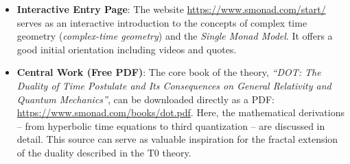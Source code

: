	\begin{itemize}
		\item \textbf{Interactive Entry Page}: The website \href{https://www.smonad.com/start/}{https://www.smonad.com/start/} serves as an interactive introduction to the concepts of complex time geometry (\emph{complex-time geometry}) and the \emph{Single Monad Model}. It offers a good initial orientation including videos and quotes.
		\item \textbf{Central Work (Free PDF)}: The core book of the theory, \emph{``DOT: The Duality of Time Postulate and Its Consequences on General Relativity and Quantum Mechanics''}, can be downloaded directly as a PDF: \href{https://www.smonad.com/books/dot.pdf}{https://www.smonad.com/books/dot.pdf}. Here, the mathematical derivations – from hyperbolic time equations to third quantization – are discussed in detail. This source can serve as valuable inspiration for the fractal extension of the duality described in the T0 theory.
	\end{itemize}
	